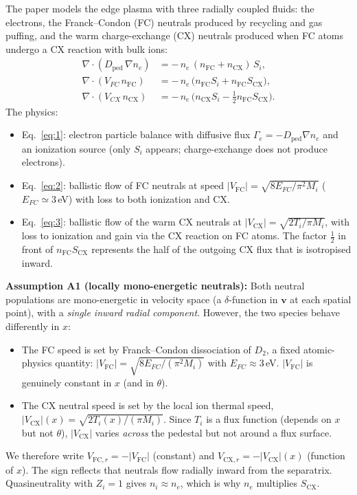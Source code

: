 \documentclass[11pt]{article}
\renewcommand{\ne}{n_{e}}  %
\newcommand{\nfc}{n_{\mathrm{FC}}}
\newcommand{\ncx}{n_{\mathrm{CX}}}
\newcommand{\Vfc}{\lvert V_{\mathrm{FC}}\rvert}
\newcommand{\Vcx}{\lvert V_{\mathrm{CX}}\rvert}
\newcommand{\Vfcr}{V_{\mathrm{FC},r}}
\newcommand{\Vcxr}{V_{\mathrm{CX},r}}
\newcommand{\Si}{S_{i}}
\newcommand{\Scx}{S_{\mathrm{CX}}}
\newcommand{\Dped}{D_{\mathrm{ped}}}
\begin{document}
The paper models the edge plasma with three radially coupled fluids: the
electrons, the Franck--Condon (FC) neutrals produced by recycling and gas
puffing, and the warm charge-exchange (CX) neutrals produced when FC atoms
undergo a CX reaction with bulk ions:
\begin{align}
  \nabla\cdot(\Dped\,\nabla\ne)
    &= -\,\ne\,(\nfc + \ncx)\,\Si, \label{eq:1} \\
  \nabla\cdot(V_{FC}\,\nfc)
    &= -\,\ne\,\bigl(\nfc\Si + \nfc\Scx\bigr), \label{eq:2} \\
  \nabla\cdot(V_{CX}\,\ncx)
    &= -\,\ne\,\bigl(\ncx\Si - \tfrac{1}{2}\nfc\Scx\bigr). \label{eq:3}
\end{align}
The physics:
\begin{itemize}
  \item Eq.~\eqref{eq:1}: electron particle balance with diffusive flux
        $\Gamma_{e}=-\Dped\nabla\ne$ and an ionization source (only $\Si$
        appears; charge-exchange does not produce electrons).
  \item Eq.~\eqref{eq:2}: ballistic flow of FC neutrals at speed
        $\Vfc = \sqrt{8E_{FC}/\pi^{2}M_i}$ ($E_{FC}\simeq 3$\,eV) with loss
        to both ionization and CX.
  \item Eq.~\eqref{eq:3}: ballistic flow of the warm CX neutrals at
        $\Vcx = \sqrt{2T_i/\pi M_i}$, with loss to ionization and gain via
        the CX reaction on FC atoms.  The factor $\tfrac{1}{2}$ in front of
        $\nfc\Scx$ represents the half of the outgoing CX flux that is
        isotropised inward.
\end{itemize}
\textbf{Assumption A1 (locally mono-energetic neutrals):} Both neutral
populations are mono-energetic in velocity space (a $\delta$-function in
$\bm{v}$ at each spatial point), with a \emph{single inward radial
component}.  However, the two species behave differently in $x$:
\begin{itemize}
  \item The FC speed is set by Franck--Condon dissociation of $D_{2}$, a
        fixed atomic-physics quantity:
        \(
          \Vfc = \sqrt{8 E_{FC}/(\pi^{2} M_{i})}
        \)
        with $E_{FC}\approx 3$\,eV.  $\Vfc$ is genuinely constant in $x$
        (and in $\theta$).
  \item The CX neutral speed is set by the local ion thermal speed,
        \(
          \Vcx(x) = \sqrt{2 T_i(x)/(\pi M_{i})}.
        \)
        Since $T_i$ is a flux function (depends on $x$ but not $\theta$),
        $\Vcx$ varies \emph{across} the pedestal but not around a flux
        surface.
\end{itemize}
We therefore write $\Vfcr = -\Vfc$ (constant) and $\Vcxr = -\Vcx(x)$
(function of $x$).  The sign reflects that neutrals flow radially inward
from the separatrix.  Quasineutrality with $Z_{i}=1$ gives
$n_{i}\approx \ne$, which is why $\ne$ multiplies $\Scx$.
\end{document}
